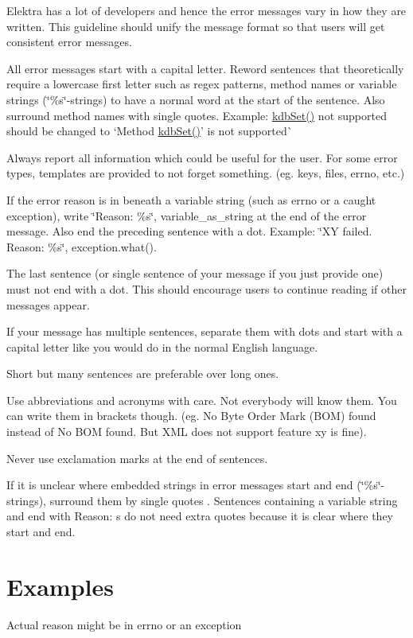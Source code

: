 Elektra has a lot of developers and hence the error messages vary in how they are written. This guideline should unify the message format so that users will get consistent error messages.


\begin{DoxyItemize}
\item All error messages start with a capital letter. Reword sentences that theoretically require a lowercase first letter such as regex patterns, method names or variable strings (\char`\"{}\%s\char`\"{}-\/strings) to have a normal word at the start of the sentence. Also surround method names with single quotes. Example\+: {\ttfamily \mbox{\hyperlink{group__kdb_ga11436b058408f83d303ca5e996832bcf}{kdb\+Set()}} not supported} should be changed to `Method \textquotesingle{}\mbox{\hyperlink{group__kdb_ga11436b058408f83d303ca5e996832bcf}{kdb\+Set()}}' is not supported\`{}
\item Always report all information which could be useful for the user. For some error types, templates are provided to not forget something. (eg. keys, files, errno, etc.)
\item If the error reason is in beneath a variable string (such as {\ttfamily errno} or a caught exception), write {\ttfamily \char`\"{}\+Reason\+: \%s\char`\"{}, variable\+\_\+as\+\_\+string} at the end of the error message. Also end the preceding sentence with a dot. Example\+: {\ttfamily \char`\"{}\+X\+Y failed. Reason\+: \%s\char`\"{}, exception.\+what()}.
\item The last sentence (or single sentence of your message if you just provide one) must not end with a dot. This should encourage users to continue reading if other messages appear.
\item If your message has multiple sentences, separate them with dots and start with a capital letter like you would do in the normal English language.
\item Short but many sentences are preferable over long ones.
\item Use abbreviations and acronyms with care. Not everybody will know them. You can write them in brackets though. (eg. {\ttfamily No Byte Order Mark (B\+OM) found} instead of {\ttfamily No B\+OM found}. But {\ttfamily X\+ML does not support feature xy} is fine).
\item Never use exclamation marks at the end of sentences.
\item If it is unclear where embedded strings in error messages start and end (\char`\"{}\%s\char`\"{}-\/strings), surround them by single quotes \textquotesingle{}. Sentences containing a variable string and end with {\ttfamily Reason\+: s} do not need extra quotes because it is clear where they start and end.
\end{DoxyItemize}\hypertarget{doc_dev_error-message_md_autotoc_md1490}{}\section{Examples}\label{doc_dev_error-message_md_autotoc_md1490}
Actual reason might be in errno or an exception


